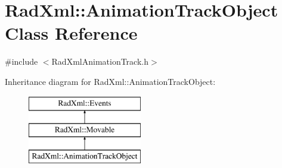 \hypertarget{class_rad_xml_1_1_animation_track_object}{\section{Rad\-Xml\-:\-:Animation\-Track\-Object Class Reference}
\label{class_rad_xml_1_1_animation_track_object}
}


{\ttfamily \#include $<$Rad\-Xml\-Animation\-Track.\-h$>$}

Inheritance diagram for Rad\-Xml\-:\-:Animation\-Track\-Object\-:\begin{figure}[H]
\begin{center}
\leavevmode
\includegraphics[height=3.000000cm]{class_rad_xml_1_1_animation_track_object}
\end{center}
\end{figure}

